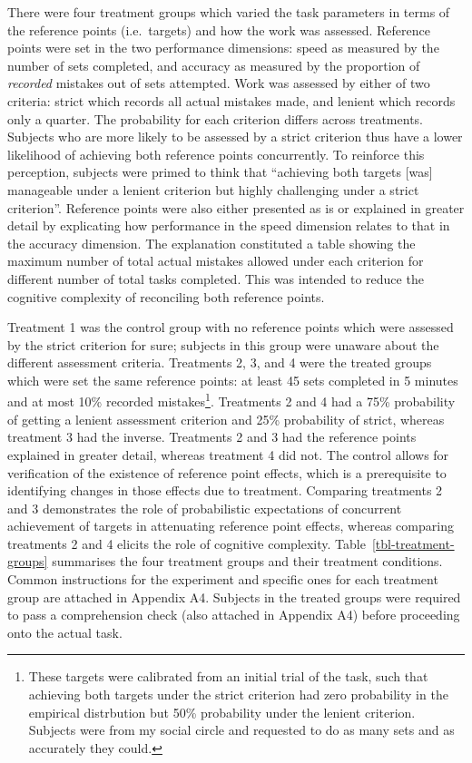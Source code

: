 \documentclass[12pt, letterpaper, DIV=11, numbers=noendperiod]{article}
\begin{document}
There were four treatment groups which varied the task parameters in terms of the reference points (i.e.~targets) and how the work was assessed. Reference points were set in the two performance dimensions: speed as measured by the number of sets completed, and accuracy as measured by the proportion of \emph{recorded} mistakes out of sets attempted. Work was assessed by either of two criteria: strict which records all actual mistakes made, and lenient which records only a quarter. The probability for each criterion differs across treatments. Subjects who are more likely to be assessed by a strict criterion thus have a lower likelihood of achieving both reference points concurrently. To reinforce this perception, subjects were primed to think that ``achieving both targets [was] manageable under a lenient criterion but highly challenging under a strict criterion''. Reference points were also either presented as is or explained in greater detail by explicating how performance in the speed dimension relates to that in the accuracy dimension. The explanation constituted a table showing the maximum number of total actual mistakes allowed under each criterion for different number of total tasks completed. This was intended to reduce the cognitive complexity of reconciling both reference points.

Treatment 1 was the control group with no reference points which were assessed by the strict criterion for sure; subjects in this group were unaware about the different assessment criteria. Treatments 2, 3, and 4 were the treated groups which were set the same reference points: at least 45 sets completed in 5 minutes and at most 10\% recorded mistakes\footnote{These targets were calibrated from an initial trial of the task, such that achieving both targets under the strict criterion had zero probability in the empirical distrbution but 50\% probability under the lenient criterion. Subjects were from my social circle and requested to do as many sets and as accurately they could.}. Treatments 2 and 4 had a 75\% probability of getting a lenient assessment criterion and 25\% probability of strict, whereas treatment 3 had the inverse. Treatments 2 and 3 had the reference points explained in greater detail, whereas treatment 4 did not. The control allows for verification of the existence of reference point effects, which is a prerequisite to identifying changes in those effects due to treatment. Comparing treatments 2 and 3 demonstrates the role of probabilistic expectations of concurrent achievement of targets in attenuating reference point effects, whereas comparing treatments 2 and 4 elicits the role of cognitive complexity. Table~\ref{tbl-treatment-groups} summarises the four treatment groups and their treatment conditions. Common instructions for the experiment and specific ones for each treatment group are attached in Appendix A4. Subjects in the treated groups were required to pass a comprehension check (also attached in Appendix A4) before proceeding onto the actual task.
\end{document}
